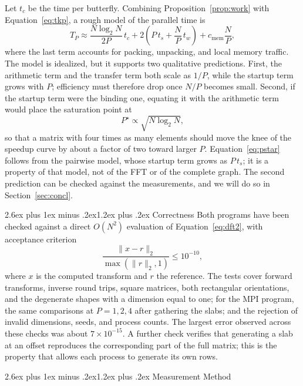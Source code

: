 \documentclass[conference,onecolumn]{IEEEtran}
\makeatletter
\renewcommand{\section}{\@startsection{section}{1}{\z@}%
  {2.6ex plus 1ex minus .2ex}{1.2ex plus .2ex}%
  {\normalfont\large\bfseries}}
\theoremstyle{course}
\makeatother
\begin{document}
Let $t_c$ be the time per butterfly. Combining Proposition~\ref{prop:work}
with Equation~\ref{eq:tkp}, a rough model of the parallel time is
\begin{equation}
 T_P\approx\frac{N\log_2 N}{2P}\,t_c
 +2\left(P\,t_s+\frac{N}{P}\,t_w\right)+c_{\mathrm{mem}}\frac{N}{P},
 \label{eq:model}
\end{equation}
where the last term accounts for packing, unpacking, and local memory
traffic. The model is idealized, but it supports two qualitative
predictions. First, the arithmetic term and the transfer term both scale as
$1/P$, while the startup term grows with $P$; efficiency must therefore
drop once $N/P$ becomes small. Second, if the startup term were the binding
one, equating it with the arithmetic term would place the saturation point
at
\begin{equation}
 P^\star\propto\sqrt{N\log_2 N}, \label{eq:pstar}
\end{equation}
so that a matrix with four times as many elements should move the knee of
the speedup curve by about a factor of two toward larger $P$.
Equation~\ref{eq:pstar} follows from the pairwise model, whose startup term
grows as $P\,t_s$; it is a property of that model, not of the FFT or of the
complete graph. The second prediction can be checked against the
measurements, and we will do so in Section~\ref{sec:concl}.

\section{Correctness}\label{sec:correct}
Both programs have been checked against a direct $O(N^2)$ evaluation of
Equation~\ref{eq:dft2}, with acceptance criterion
\[
 \frac{\lVert x-r\rVert_2}{\max(\lVert r\rVert_2,1)}\le 10^{-10},
\]
where $x$ is the computed transform and $r$ the reference. The tests cover
forward transforms, inverse round trips, square matrices, both rectangular
orientations, and the degenerate shapes with a dimension equal to one; for
the MPI program, the same comparisons at $P=1,2,4$ after gathering the
slabs; and the rejection of invalid dimensions, seeds, and process counts.
The largest error observed across these checks was about
$7\times10^{-15}$. A further check verifies that generating a slab at an
offset reproduces the corresponding part of the full matrix; this is the
property that allows each process to generate its own rows.

\section{Measurement Method}\label{sec:method}
\end{document}
